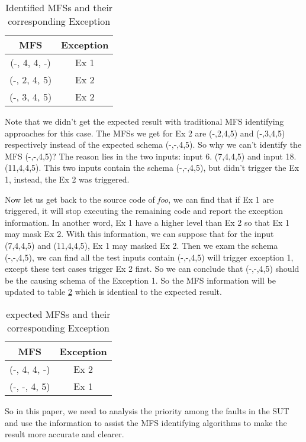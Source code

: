 \documentclass{sig-alternate}
\begin{document}
\begin{table}
\centering
\caption{Identified MFSs and their corresponding Exception}
\label{identify-example}
\begin{tabular}{|c|c|} \hline
MFS & Exception\\ \hline
(-, 4, 4, -) &  Ex 1\\ \hline
(-, 2, 4, 5) &  Ex 2\\ \hline
(-, 3, 4, 5) &  Ex 2\\ \hline
\hline\end{tabular}
\end{table}

Note that we didn't get the expected result with traditional MFS identifying approaches for this case. The MFSs we get for Ex 2 are (-,2,4,5) and (-,3,4,5) respectively instead of the expected schema (-,-,4,5). So why we can't identify the MFS (-,-,4,5)? The reason lies in the two inputs: input 6. (7,4,4,5) and input 18. (11,4,4,5). This two inputs contain the schema (-,-,4,5), but didn't trigger the Ex 1, instead, the Ex 2 was triggered.

Now let us get back to the source code of \emph{foo}, we can find that if Ex 1 are triggered, it will stop executing the remaining code and report the exception information. In another word, Ex 1 have a higher level than Ex 2 so that Ex 1 may mask Ex 2. With this information, we can suppose that for the input (7,4,4,5) and (11,4,4,5), Ex 1 may masked Ex 2. Then we exam the schema (-,-,4,5), we can find all the test inputs contain (-,-,4,5) will trigger exception 1, except these test cases trigger Ex 2 first. So we can conclude that (-,-,4,5) should be the causing schema of the Exception 1. So the MFS information will be updated to table \ref{expected-example} which is identical to the expected result.

\begin{table}
\centering
\caption{expected MFSs and their corresponding Exception}
\label{expected-example}
\begin{tabular}{|c|c|} \hline
MFS & Exception\\ \hline
(-, 4, 4, -) &  Ex 2\\ \hline
(-, -, 4, 5) &  Ex 1\\ \hline
\hline\end{tabular}
\end{table}

So in this paper, we need to analysis the priority among the faults in the SUT and use the information to assist the MFS identifying algorithms to make the result more accurate and clearer.
\end{document}
